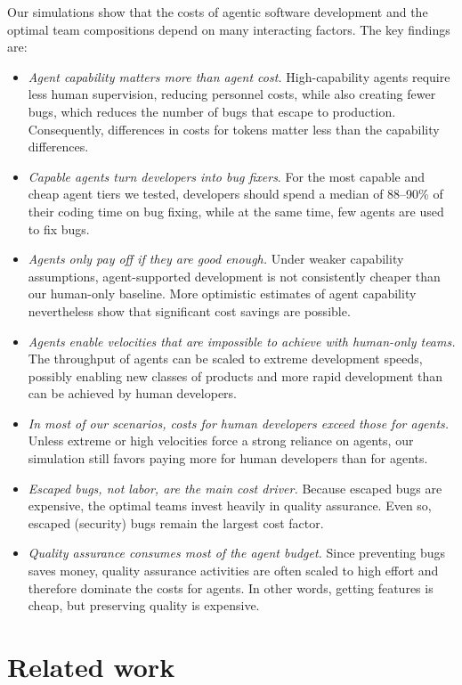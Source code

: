\documentclass[smallextended]{svjour3}       %
\begin{document}
Our simulations show that the costs of agentic software development and the optimal team compositions depend on many interacting factors. The key findings are:
\begin{itemize}
  \item \emph{Agent capability matters more than agent cost.} High-capability agents require less human supervision, reducing personnel costs, while also creating fewer bugs, which reduces the number of bugs that escape to production. Consequently, differences in costs for tokens matter less than the capability differences. 
  \item \emph{Capable agents turn developers into bug fixers}. For the most capable and cheap agent tiers we tested, developers should spend a median of 88--90\% of their coding time on bug fixing, while at the same time, few agents are used to fix bugs. 
  \item \emph{Agents only pay off if they are good enough.} Under weaker capability assumptions, agent-supported development is not consistently cheaper than our human-only baseline. More optimistic estimates of agent capability nevertheless show that significant cost savings are possible. 
  \item \emph{Agents enable velocities that are impossible to achieve with human-only teams.} The throughput of agents can be scaled to extreme development speeds, possibly enabling new classes of products and more rapid development than can be achieved by human developers. 
  \item \emph{In most of our scenarios, costs for human developers exceed those for agents.} Unless extreme or high velocities force a strong reliance on agents, our simulation still favors paying more for human developers than for agents. 
  \item \emph{Escaped bugs, not labor, are the main cost driver.} Because escaped bugs are expensive, the optimal teams invest heavily in quality assurance. Even so, escaped (security) bugs remain the largest cost factor.
  \item \emph{Quality assurance consumes most of the agent budget.} Since preventing bugs saves money, quality assurance activities are often scaled to high effort and therefore dominate the costs for agents. In other words, getting features is cheap, but preserving quality is expensive.
\end{itemize}

\section{Related work}
\label{sec:related}
\end{document}

